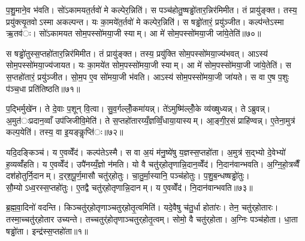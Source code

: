 प॒शु॒माने॒व भ॑वति। सो॑ऽकामयत॒र्तवो॑ मे कल्पेर॒न्निति॑। स पञ्च॑होतु॒ष्षड्ढो॑तार॒न्निर॑मिमीत। तं प्रायु॑ङ्क्त। तस्य॒ प्रयु॑क्त्यृ॒तवोऽस्मा अकल्पन्त। यः का॒मये॑त॒र्तवो॑ मे कल्पेर॒न्निति॑। स षड्ढो॑तारं॒ प्रयु॑ञ्जीत। कल्प॑न्तेऽस्मा ऋ॒तव॑ः। सो॑ऽकामयत सोम॒पस्सो॑मया॒जी स्याम्। आ मे॑ सोम॒पस्सो॑मया॒जी जा॑ये॒तेति॑॥७०॥

स षड्ढो॑तुस्स॒प्तहो॑तार॒न्निर॑मिमीत। तं प्रायु॑ङ्क्त। तस्य॒ प्रयु॑क्ति सोम॒पस्सो॑मया॒ज्य॑भवत्। आऽस्य॑ सोम॒पस्सो॑मया॒ज्य॑जायत। यः का॒मये॑त सोम॒पस्सो॑मया॒जी स्याम्। आ मे॑ सोम॒पस्सो॑मया॒जी जा॑ये॒तेति॑। स स॒प्तहो॑तारं॒ प्रयु॑ञ्जीत। सो॒म॒प ए॒व सो॑मया॒जी भ॑वति। आऽस्य॑ सोम॒पस्सो॑मया॒जी जा॑यते। स वा ए॒ष प॒शुः प॑ञ्च॒धा प्रति॑तिष्ठति॥७१॥

प॒द्भिर्मुखे॑न। ते दे॒वाः प॒शून् वि॒त्वा। सु॒व॒र्गल्लोँ॒कमा॑यन्न्। ते॑ऽमुष्मि॑ल्लोँ॒के व्य॑ख्षुध्यन्न्। तेऽब्रुवन्न्। अ॒मुत॑ःप्रदान॒व्वाँ उप॑जिजीवि॒मेति॑। ते स॒प्तहो॑तारय्यँ॒ज्ञव्विँ॒धाया॒यास्यम्। आ॒ङ्गी॒र॒सं प्राहि॑ण्वन्न्। ए॒तेना॒मुत्र॑ कल्प॒येति॑। तस्य॒ वा इ॒यङ्कॢप्ति॑ः॥७२॥

यदि॒दङ्किञ्च॑। य ए॒वव्वेँद॑। कल्प॑तेऽस्मै। स वा अ॒यं म॑नु॒ष्ये॑षु य॒ज्ञस्स॒प्तहो॑ता। अ॒मुत्र॑ स॒द्भ्यो दे॒वेभ्यो॑ ह॒व्यव्वँ॑हति। य ए॒वव्वेँद॑। उपै॑नय्यँ॒ज्ञो न॑मति। यो वै चतु॑र्‌होतृणान्नि॒दान॒व्वेँद॑। नि॒दान॑वान्भवति। अ॒ग्नि॒हो॒त्रव्वैँ दश॑होतुर्नि॒दानम्। द॒र्‌श॒पू॒र्ण॒मासौ चतु॑र्‌होतुः। चा॒तु॒र्मा॒स्यानि॒ पञ्च॑होतुः। प॒शु॒ब॒न्धष्षड्ढो॑तुः। सौ॒म्योऽध्व॒रस्स॒प्तहो॑तुः। ए॒तद्वै चतु॑र्‌होतृणान्नि॒दानम्। य ए॒वव्वेँद॑। नि॒दान॑वान्भवति॥७३॥




ब्र॒ह्म॒वा॒दिनो॑ वदन्ति। किञ्चतु॑र्‌होतृणाञ्चतुर्‌होतृ॒त्वमिति॑। यदे॒वैषु च॑तु॒र्धा होता॑रः। तेन॒ चतु॑र्‌होतारः। तस्मा॒च्चतु॑र्‌होतार उच्यन्ते। तच्चतुर्॑होतृणाञ्चतुर्‌होतृ॒त्वम्। सोमो॒ वै चतु॑र्‌होता। अ॒ग्निः पञ्च॑होता। धा॒ता षड्ढो॑ता। इन्द्र॑स्स॒प्तहो॑ता॥१॥

